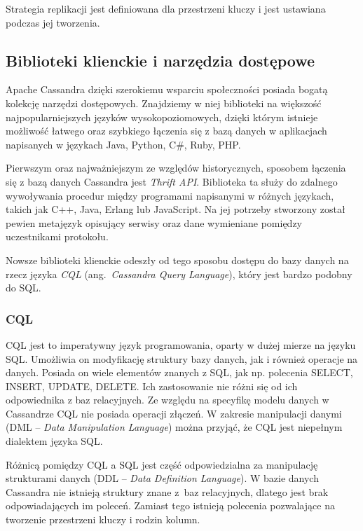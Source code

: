 Strategia replikacji jest definiowana dla przestrzeni kluczy i jest ustawiana podczas jej tworzenia.

\subsection{Biblioteki klienckie i narzędzia dostępowe}

Apache Cassandra dzięki szerokiemu wsparciu społeczności posiada bogatą kolekcję narzędzi dostępowych. 
Znajdziemy w niej biblioteki na większość najpopularniejszych języków wysokopoziomowych, dzięki którym istnieje możliwość łatwego oraz szybkiego łączenia się z bazą danych w aplikacjach napisanych w językach Java, Python, C\#, Ruby, PHP.

Pierwszym oraz najważniejszym ze względów historycznych, sposobem łączenia się z bazą danych Cassandra jest \textit{Thrift API}.
Biblioteka ta służy do zdalnego wywoływania procedur między programami napisanymi w różnych językach, takich jak C++, Java, Erlang lub JavaScript.
Na jej potrzeby stworzony został pewien metajęzyk opisujący serwisy oraz dane wymieniane pomiędzy uczestnikami protokołu.

Nowsze biblioteki klienckie odeszły od tego sposobu dostępu do bazy danych na rzecz języka \textit{CQL} (ang.~\textit{Cassandra Query Language}), który jest bardzo podobny do SQL.

\subsubsection{CQL}

CQL jest to imperatywny język programowania, oparty w dużej mierze na języku SQL.
Umożliwia on modyfikację struktury bazy danych, jak i również operacje na danych.
Posiada on wiele elementów znanych z SQL, jak np. polecenia SELECT, INSERT, UPDATE, DELETE.
Ich zastosowanie nie różni się od ich odpowiednika z baz relacyjnych. 
Ze względu na specyfikę modelu danych w Cassandrze CQL nie posiada operacji złączeń.
W zakresie manipulacji danymi (DML -- \textit{Data Manipulation Language}) można przyjąć, że CQL jest niepełnym dialektem języka SQL.

Różnicą pomiędzy CQL a SQL jest część odpowiedzialna za manipulację strukturami danych (DDL -- \textit{Data Definition Language}).
W bazie danych Cassandra nie istnieją struktury znane z~baz relacyjnych, dlatego jest brak odpowiadających im poleceń.
Zamiast tego istnieją polecenia pozwalające na tworzenie przestrzeni kluczy i rodzin kolumn.

